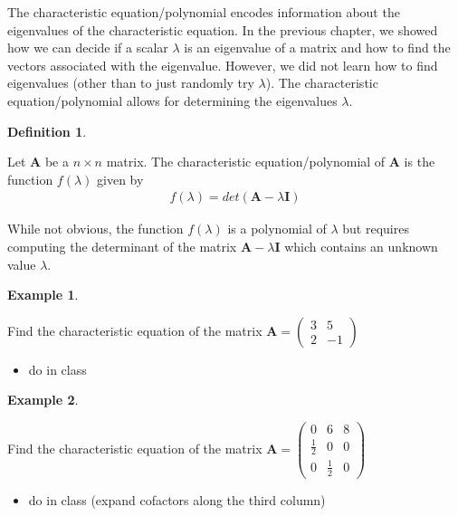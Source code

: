 \documentclass[
]{book}
\providecommand{\tightlist}{%
  \setlength{\itemsep}{0pt}\setlength{\parskip}{0pt}}
\theoremstyle{definition}
\newtheorem{definition}{Definition}[chapter]
\theoremstyle{definition}
\newtheorem{example}{Example}[chapter]
\theoremstyle{definition}
\theoremstyle{remark}
\begin{document}
The characteristic equation/polynomial encodes information about the eigenvalues of the characteristic equation. In the previous chapter, we showed how we can decide if a scalar \(\lambda\) is an eigenvalue of a matrix and how to find the vectors associated with the eigenvalue. However, we did not learn how to find eigenvalues (other than to just randomly try \(\lambda\)). The characteristic equation/polynomial allows for determining the eigenvalues \(\lambda\).

\begin{definition}
\protect\hypertarget{def:unlabeled-div-167}{}\label{def:unlabeled-div-167}

Let \(\mathbf{A}\) be a \(n \times n\) matrix. The characteristic equation/polynomial of \(\mathbf{A}\) is the function \(f(\lambda)\) given by
\[
\begin{aligned}
f(\lambda) = det(\mathbf{A} - \lambda \mathbf{I})
\end{aligned}
\]

\end{definition}

While not obvious, the function \(f(\lambda)\) is a polynomial of \(\lambda\) but requires computing the determinant of the matrix \(\mathbf{A} - \lambda \mathbf{I}\) which contains an unknown value \(\lambda\).

\begin{example}
\protect\hypertarget{exm:unlabeled-div-168}{}\label{exm:unlabeled-div-168}

Find the characteristic equation of the matrix \(\mathbf{A} = \begin{pmatrix} 3 & 5 \\ 2 & -1 \end{pmatrix}\)

\begin{itemize}
\tightlist
\item
  do in class
\end{itemize}

\end{example}

\begin{example}
\protect\hypertarget{exm:unlabeled-div-169}{}\label{exm:unlabeled-div-169}

Find the characteristic equation of the matrix \(\mathbf{A} = \begin{pmatrix} 0 & 6 & 8 \\ \frac{1}{2} & 0 & 0 \\ 0 & \frac{1}{2} & 0 \end{pmatrix}\)

\begin{itemize}
\tightlist
\item
  do in class (expand cofactors along the third column)
\end{itemize}

\end{example}
\end{document}
